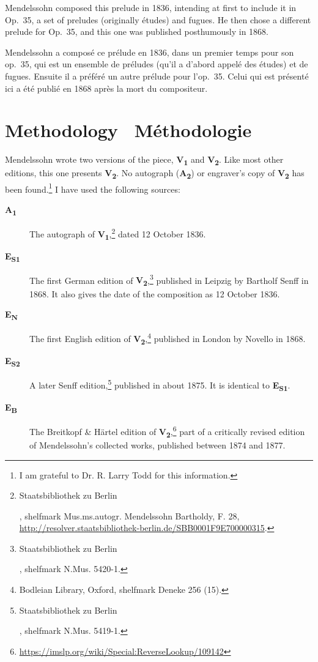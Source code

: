 \documentclass[a4paper, 12pt]{book}
\newcommand{\source}[2]{\textbf{#1\textsubscript{#2}}}
\newcommand{\bigdot}[0]{{\Large \textbullet}}
\newcommand{\centerbigdot}[0]{\begin{center}\bigdot\end{center}}
\begin{document}
Mendelssohn composed this prelude in 1836, intending at first to
include it in Op.\ 35, a set of preludes (originally études) and
fugues. He then chose a different prelude for Op.\ 35, and this one
was published posthumously in 1868.\autocite[188--198]{todd_2008}

\centerbigdot

Mendelssohn a composé ce prélude en 1836, dans un premier temps pour
son op.\ 35, qui est un ensemble de préludes (qu'il a d'abord appelé
des études) et de fugues. Ensuite il a préféré un autre prélude pour
l'op.\ 35. Celui qui est présenté ici a été publié en 1868 après la
mort du compositeur.

\ifdef{\critical}
  {%
    \section*{Methodology \bigdot\ Méthodologie}

    Mendelssohn wrote two versions of the piece, \source{V}{1} and
    \source{V}{2}. Like most other editions, this one presents
    \source{V}{2}. No autograph (\source{A}{2}) or engraver's copy of
    \source{V}{2} has been found.\footnote{I am grateful to
      Dr. R. Larry Todd for this information.} I have used the
    following sources:
    
    \begin{description}
    \item[\source{A}{1}] The autograph of
      \source{V}{1},\footnote{\begin{otherlanguage}{ngerman}Staatsbibliothek
          zu Berlin\end{otherlanguage}, shelfmark
          Mus.ms.autogr. Mendelssohn Bartholdy, F. 28,
          \url{http://resolver.staatsbibliothek-berlin.de/SBB0001F9E700000315}.}
      dated 12 October 1836.
    \item[\source{E}{S1}] The first German edition of
      \source{V}{2},\footnote{\begin{otherlanguage}{ngerman}Staatsbibliothek
          zu Berlin\end{otherlanguage}, shelfmark N.Mus. 5420-1.}
      published in Leipzig by Bartholf Senff in 1868. It also gives
      the date of the composition as 12 October 1836.
    \item[\source{E}{N}] The first English edition of
      \source{V}{2},\footnote{Bodleian Library, Oxford, shelfmark
        Deneke 256 (15).} published in London by Novello in 1868.
    \item[\source{E}{S2}] A later Senff
      edition,\footnote{\begin{otherlanguage}{ngerman}Staatsbibliothek
          zu Berlin\end{otherlanguage}, shelfmark N.Mus. 5419-1.}
      published in about 1875. It is identical to \source{E}{S1}.
    \item[\source{E}{B}] The Breitkopf \& Härtel edition of
      \source{V}{2},\footnote{\url{https://imslp.org/wiki/Special:ReverseLookup/109142}}
      part of a critically revised edition of Mendelssohn's collected
      works, published between 1874 and 1877.
    \end{description}

}
\end{document}
